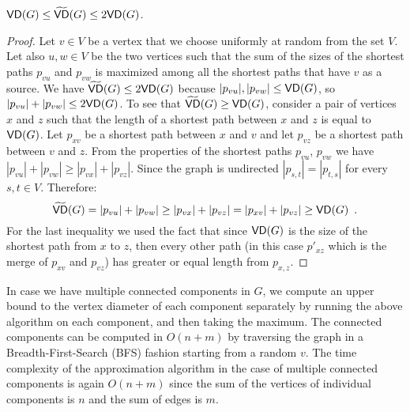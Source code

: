\begin{lemma}\label{lem:diam}
  $\mathsf{VD}(G)\le\widetilde{\mathsf{VD}}(G)\le 2\mathsf{VD}(G)$.
\end{lemma}
\begin{proof}
  Let $v\in V$ be a vertex that we choose uniformly at random from the set $V$.
  Let also $u,w\in V$ be the two vertices such that the sum of the sizes of the
  shortest paths $p_{vu}$ and $p_{vw}$ is maximized among all the shortest paths
  that have $v$ as a source.  We have $\widetilde{\mathsf{VD}}(G)\le 2\mathsf{VD}(G)$ because
  $|p_{vu}|,|p_{vw}|\le\mathsf{VD}(G)$, so $|p_{vu}|+|p_{vw}|\le 2\mathsf{VD}(G)$. To see
  that $\widetilde{\mathsf{VD}}(G)\ge\mathsf{VD}(G)$, consider a pair of vertices $x$ and $z$ such
  that the length of a shortest path between $x$ and $z$ is equal to $\mathsf{VD}(G)$.
  Let $p_{xv}$ be a shortest path between $x$ and $v$ and let $p_{vz}$ be a
  shortest path between $v$ and $z$. 
  From the properties of the shortest paths $p_{vu}$, $p_{vw}$ we have
  $|p_{vu}|+|p_{vw}|\geq |p_{vx}|+|p_{vz}|$. Since the graph is undirected
  $|p_{s,t}|=|p_{t,s}|$ for every $s,t\in V$.
  Therefore:
  \[
    \widetilde{\mathsf{VD}}(G) = |p_{vu}|+|p_{vw}|\geq |p_{vx}|+|p_{vz}| =
    |p_{xv}|+|p_{vz}|\ge\mathsf{VD}(G)\enspace. 
  \]
  For the last inequality we used the fact that since $\mathsf{VD}(G)$ is the size of
  the shortest path from $x$ to $z$, then every other path (in this case
  $p'_{xz}$ which is the merge of $p_{xv}$ and $p_{vz}$) has greater or equal
  length from $p_{x,z}$.
\end{proof}

In case we have multiple connected components in $G$, we compute an upper bound
to the vertex diameter of each component separately by running the above
algorithm on each component, and then taking the maximum. 
The connected components can be computed in $O(n+m)$ by traversing the graph in
a Breadth-First-Search (BFS) fashion starting from a random $v$.
The time complexity of the approximation algorithm in the case of multiple
connected components is again $O(n+m)$ since the sum of the vertices of
individual components is $n$ and the sum of edges is $m$. 

